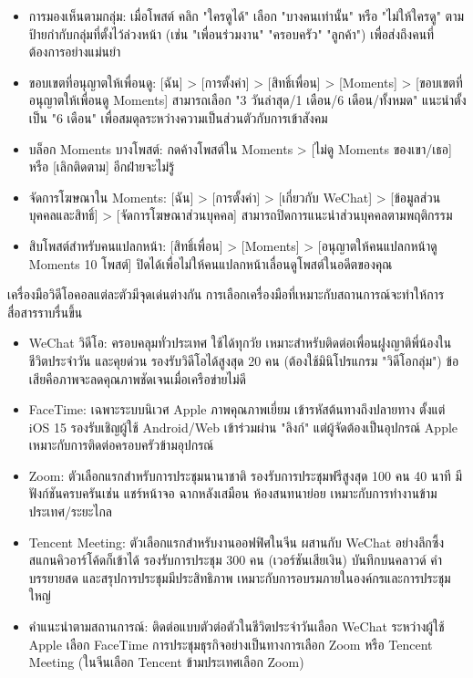 
\begin{itemize}
  \item การมองเห็นตามกลุ่ม: เมื่อโพสต์ คลิก "ใครดูได้" เลือก "บางคนเท่านั้น" หรือ "ไม่ให้ใครดู" ตามป้ายกำกับกลุ่มที่ตั้งไว้ล่วงหน้า (เช่น "เพื่อนร่วมงาน" "ครอบครัว" "ลูกค้า") เพื่อส่งถึงคนที่ต้องการอย่างแม่นยำ
  \item ขอบเขตที่อนุญาตให้เพื่อนดู: [ฉัน] > [การตั้งค่า] > [สิทธิ์เพื่อน] > [Moments] > [ขอบเขตที่อนุญาตให้เพื่อนดู Moments] สามารถเลือก "3 วันล่าสุด/1 เดือน/6 เดือน/ทั้งหมด" แนะนำตั้งเป็น "6 เดือน" เพื่อสมดุลระหว่างความเป็นส่วนตัวกับการเข้าสังคม
  \item บล็อก Moments บางโพสต์: กดค้างโพสต์ใน Moments > [ไม่ดู Moments ของเขา/เธอ] หรือ [เลิกติดตาม] อีกฝ่ายจะไม่รู้
  \item จัดการโฆษณาใน Moments: [ฉัน] > [การตั้งค่า] > [เกี่ยวกับ WeChat] > [ข้อมูลส่วนบุคคลและสิทธิ์] > [จัดการโฆษณาส่วนบุคคล] สามารถปิดการแนะนำส่วนบุคคลตามพฤติกรรม
  \item สิบโพสต์สำหรับคนแปลกหน้า: [สิทธิ์เพื่อน] > [Moments] > [อนุญาตให้คนแปลกหน้าดู Moments 10 โพสต์] ปิดได้เพื่อไม่ให้คนแปลกหน้าเลื่อนดูโพสต์ในอดีตของคุณ
\end{itemize}


เครื่องมือวิดีโอคอลแต่ละตัวมีจุดเด่นต่างกัน การเลือกเครื่องมือที่เหมาะกับสถานการณ์จะทำให้การสื่อสารราบรื่นขึ้น

\begin{itemize}
  \item WeChat วิดีโอ: ครอบคลุมทั่วประเทศ ใช้ได้ทุกวัย เหมาะสำหรับติดต่อเพื่อนฝูงญาติพี่น้องในชีวิตประจำวัน และคุยด่วน รองรับวิดีโอได้สูงสุด 20 คน (ต้องใช้มินิโปรแกรม "วิดีโอกลุ่ม") ข้อเสียคือภาพจะลดคุณภาพชัดเจนเมื่อเครือข่ายไม่ดี
  \item FaceTime: เฉพาะระบบนิเวศ Apple ภาพคุณภาพเยี่ยม เข้ารหัสต้นทางถึงปลายทาง ตั้งแต่ iOS 15 รองรับเชิญผู้ใช้ Android/Web เข้าร่วมผ่าน "ลิงก์" แต่ผู้จัดต้องเป็นอุปกรณ์ Apple เหมาะกับการติดต่อครอบครัวข้ามอุปกรณ์
  \item Zoom: ตัวเลือกแรกสำหรับการประชุมนานาชาติ รองรับการประชุมฟรีสูงสุด 100 คน 40 นาที มีฟังก์ชันครบครันเช่น แชร์หน้าจอ ฉากหลังเสมือน ห้องสนทนาย่อย เหมาะกับการทำงานข้ามประเทศ/ระยะไกล
  \item Tencent Meeting: ตัวเลือกแรกสำหรับงานออฟฟิศในจีน ผสานกับ WeChat อย่างลึกซึ้ง สแกนคิวอาร์โค้ดก็เข้าได้ รองรับการประชุม 300 คน (เวอร์ชันเสียเงิน) บันทึกบนคลาวด์ คำบรรยายสด และสรุปการประชุมมีประสิทธิภาพ เหมาะกับการอบรมภายในองค์กรและการประชุมใหญ่
  \item คำแนะนำตามสถานการณ์: ติดต่อแบบตัวต่อตัวในชีวิตประจำวันเลือก WeChat ระหว่างผู้ใช้ Apple เลือก FaceTime การประชุมธุรกิจอย่างเป็นทางการเลือก Zoom หรือ Tencent Meeting (ในจีนเลือก Tencent ข้ามประเทศเลือก Zoom)
\end{itemize}

